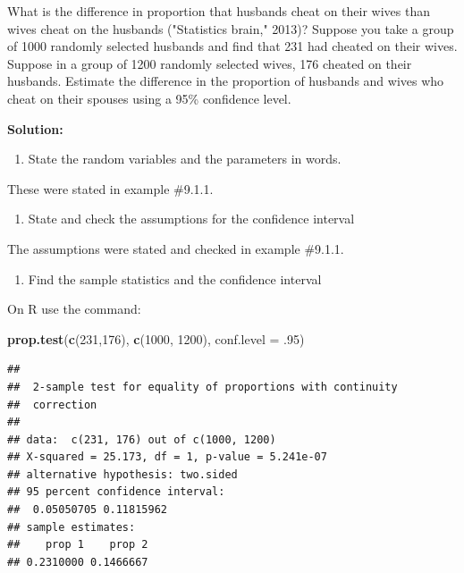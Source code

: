 \documentclass[]{book}
\newenvironment{Shaded}{\begin{snugshade}}{\end{snugshade}}
\newcommand{\DataTypeTok}[1]{\textcolor[rgb]{0.13,0.29,0.53}{#1}}
\newcommand{\DecValTok}[1]{\textcolor[rgb]{0.00,0.00,0.81}{#1}}
\newcommand{\FloatTok}[1]{\textcolor[rgb]{0.00,0.00,0.81}{#1}}
\newcommand{\KeywordTok}[1]{\textcolor[rgb]{0.13,0.29,0.53}{\textbf{#1}}}
\newcommand{\NormalTok}[1]{#1}
\providecommand{\tightlist}{%
  \setlength{\itemsep}{0pt}\setlength{\parskip}{0pt}}
\begin{document}
What is the difference in proportion that husbands cheat on their wives than wives cheat on the husbands ("Statistics brain," 2013)? Suppose you take a group of 1000 randomly selected husbands and find that 231 had cheated on their wives. Suppose in a group of 1200 randomly selected wives, 176 cheated on their husbands. Estimate the difference in the proportion of husbands and wives who cheat on their spouses using a 95\% confidence level.

\textbf{Solution:}

\begin{enumerate}
\def\labelenumi{\arabic{enumi}.}
\tightlist
\item
  State the random variables and the parameters in words.
\end{enumerate}

These were stated in example \#9.1.1.

\begin{enumerate}
\def\labelenumi{\arabic{enumi}.}
\setcounter{enumi}{1}
\tightlist
\item
  State and check the assumptions for the confidence interval
\end{enumerate}

The assumptions were stated and checked in example \#9.1.1.

\begin{enumerate}
\def\labelenumi{\arabic{enumi}.}
\setcounter{enumi}{2}
\tightlist
\item
  Find the sample statistics and the confidence interval
\end{enumerate}

On R use the command:

\begin{Shaded}
\begin{Highlighting}[]
\KeywordTok{prop.test}\NormalTok{(}\KeywordTok{c}\NormalTok{(}\DecValTok{231}\NormalTok{,}\DecValTok{176}\NormalTok{), }\KeywordTok{c}\NormalTok{(}\DecValTok{1000}\NormalTok{, }\DecValTok{1200}\NormalTok{), }\DataTypeTok{conf.level =} \FloatTok{.95}\NormalTok{)}
\end{Highlighting}
\end{Shaded}

\begin{verbatim}
## 
##  2-sample test for equality of proportions with continuity
##  correction
## 
## data:  c(231, 176) out of c(1000, 1200)
## X-squared = 25.173, df = 1, p-value = 5.241e-07
## alternative hypothesis: two.sided
## 95 percent confidence interval:
##  0.05050705 0.11815962
## sample estimates:
##    prop 1    prop 2 
## 0.2310000 0.1466667
\end{verbatim}
\end{document}
